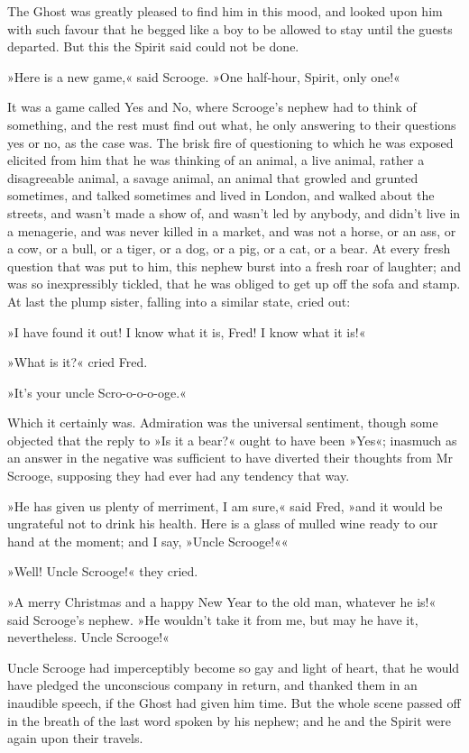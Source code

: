 The Ghost was greatly pleased to find him in this mood, and looked upon him with such favour that he begged like a boy to be allowed to stay until the guests departed. But this the Spirit said could not be done.

»Here is a new game,« said Scrooge. »One half-hour, Spirit, only one!«

It was a game called Yes and No, where Scrooge's nephew had to think of something, and the rest must find out what, he only answering to their questions yes or no, as the case was. The brisk fire of questioning to which he was exposed elicited from him that he was thinking of an animal, a live animal, rather a disagreeable animal, a savage animal, an animal that growled and grunted sometimes, and talked sometimes and lived in London, and walked about the streets, and wasn't made a show of, and wasn't led by anybody, and didn't live in a menagerie, and was never killed in a market, and was not a horse, or an ass, or a cow, or a bull, or a tiger, or a dog, or a pig, or a cat, or a bear. At every fresh question that was put to him, this nephew burst into a fresh roar of laughter; and was so inexpressibly tickled, that he was obliged to get up off the sofa and stamp. At last the plump sister, falling into a similar state, cried out:

»I have found it out! I know what it is, Fred! I know what it is!«

»What is it?« cried Fred.

»It's your uncle Scro-o-o-o-oge.«

Which it certainly was. Admiration was the universal sentiment, though some objected that the reply to »Is it a bear?« ought to have been »Yes«; inasmuch as an answer in the negative was sufficient to have diverted their thoughts from Mr Scrooge, supposing they had ever had any tendency that way.

»He has given us plenty of merriment, I am sure,« said Fred, »and it would be ungrateful not to drink his health. Here is a glass of mulled wine ready to our hand at the moment; and I say, »Uncle Scrooge!««

»Well! Uncle Scrooge!« they cried.

»A merry Christmas and a happy New Year to the old man, whatever he is!« said Scrooge's nephew. »He wouldn't take it from me, but may he have it, nevertheless. Uncle Scrooge!«

Uncle Scrooge had imperceptibly become so gay and light of heart, that he would have pledged the unconscious company in return, and thanked them in an inaudible speech, if the Ghost had given him time. But the whole scene passed off in the breath of the last word spoken by his nephew; and he and the Spirit were again upon their travels.

